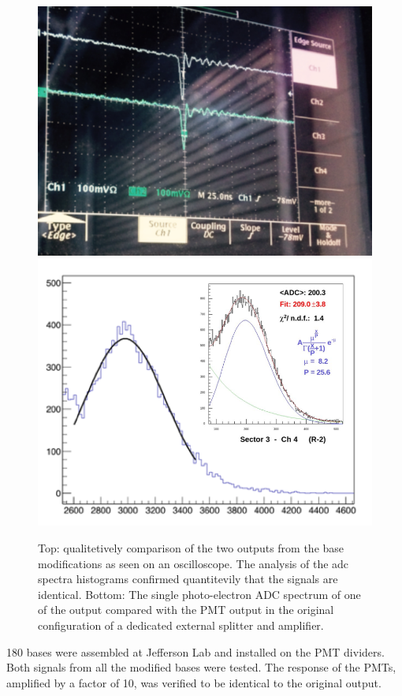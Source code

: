 \begin{figure}
	\centering
	\includegraphics[width=0.87\columnwidth,keepaspectratio]{img/doubleSignal.png}
	\includegraphics[width=0.97\columnwidth,keepaspectratio]{img/fadcOutput.png}
	\caption{Top: qualitetively comparison of the two outputs from the base modifications as seen on an oscilloscope.
				The analysis of the adc spectra histograms confirmed quantitevily that the signals are identical. Bottom:
				The single photo-electron ADC spectrum of one of the output compared with the PMT output in the original
            configuration of a dedicated external splitter and amplifier.
    }
	\label{fig:dividerTests}
\end{figure}

180 bases were assembled at Jefferson Lab and installed on the PMT dividers. Both signals from all the modified bases were tested.
The response of the PMTs, amplified by a factor of 10, was verified to be identical to the original output.


